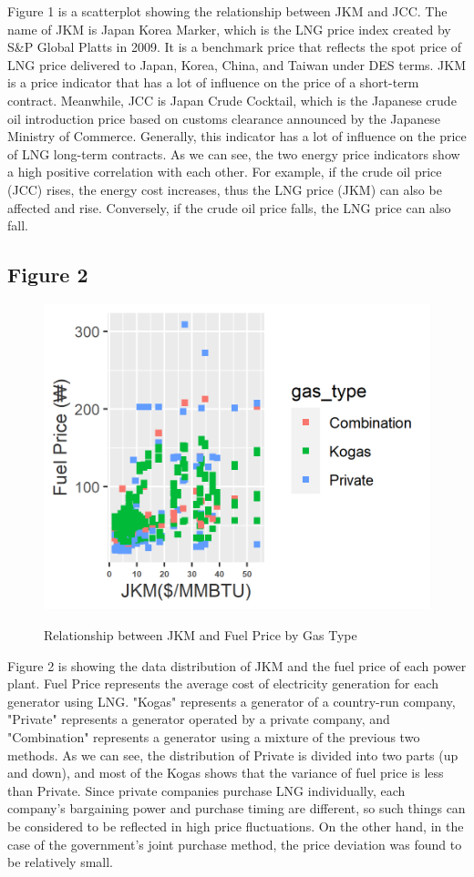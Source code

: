 \documentclass{article}
\begin{document}
\large{Figure 1 is a scatterplot showing the relationship between JKM and JCC. The name of JKM is Japan Korea Marker, which is the LNG price index created by S\&P Global Platts in 2009. It is a benchmark price that reflects the spot price of LNG price delivered to Japan, Korea, China, and Taiwan under DES terms. JKM is a price indicator that has a lot of influence on the price of a short-term contract. 
Meanwhile, JCC is Japan Crude Cocktail, which is the Japanese crude oil introduction price based on customs clearance announced by the Japanese Ministry of Commerce. Generally, this indicator has a lot of influence on the price of LNG long-term contracts. 
As we can see, the two energy price indicators show a high positive correlation with each other. For example, if the crude oil price (JCC) rises, the energy cost increases, thus the LNG price (JKM) can also be affected and rise. Conversely, if the crude oil price falls, the LNG price can also fall.}
\\

\subsection{Figure 2}

\begin{figure}[t]
    \centering
            \caption{Relationship between JKM and Fuel Price by Gas Type}
        \includegraphics[width=0.5\linewidth]{Figure2.png}
        \label{fig:88mono}
\end{figure}

\large{Figure 2 is showing the data distribution of JKM and the fuel price of each power plant. Fuel Price represents the average cost of electricity generation for each generator using LNG.
"Kogas" represents a generator of a country-run company, "Private" represents a generator operated by a private company, and "Combination" represents a generator using a mixture of the previous two methods. 
As we can see, the distribution of Private is divided into two parts (up and down), and most of the Kogas shows that the variance of fuel price is less than Private. Since private companies purchase LNG individually, each company's bargaining power and purchase timing are different, so such things can be considered to be reflected in high price fluctuations. On the other hand, in the case of the government's joint purchase method, the price deviation was found to be relatively small.}
\\
\end{document}
